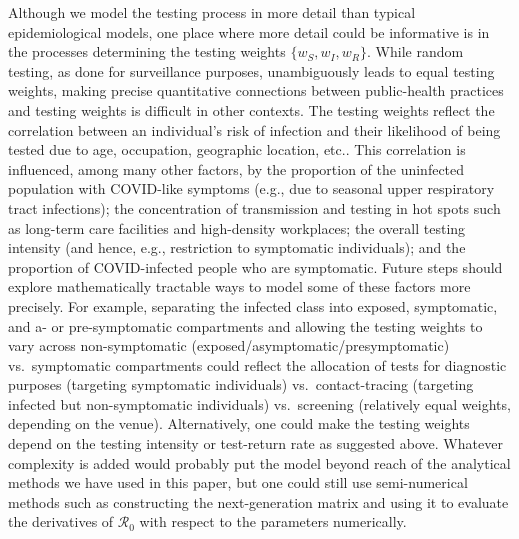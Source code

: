 \documentclass[12pt]{article}
\newcommand{\Rnum}{\ensuremath{\mathcal{R}_0}\xspace}
\DeclareRobustCommand\_{\ifmmode\expandafter\subtxt\else\textunderscore\fi}
\theoremstyle{definition} %
\begin{document}
Although we model the testing process in more detail than typical epidemiological models, one place where more detail could be informative is in the processes determining the testing weights $\{w_S, w_I, w_R\}$. While random testing, as done for surveillance purposes, unambiguously leads to equal testing weights, making precise quantitative connections between public-health practices and testing weights is difficult in other contexts. The testing weights reflect the correlation between an individual's risk of infection and their likelihood of being tested due to age, occupation, geographic location, etc.. This correlation is influenced, among many other factors, by the proportion of the uninfected population with COVID-like symptoms (e.g., due to seasonal upper respiratory tract infections); the concentration of transmission and testing in hot spots such as long-term care facilities and high-density workplaces; the overall testing intensity (and hence, e.g., restriction to symptomatic individuals); and the proportion of COVID-infected people who are symptomatic. Future steps should explore mathematically tractable ways to model some of these factors more precisely. For example, separating the infected class into exposed, symptomatic, and a- or pre-symptomatic compartments and allowing the testing weights to vary across non-symptomatic (exposed/asymptomatic/presymptomatic) vs.\ symptomatic compartments could reflect the allocation of tests for diagnostic purposes (targeting symptomatic individuals) vs.\ contact-tracing (targeting infected but non-symptomatic individuals) vs.\ screening (relatively equal weights, depending on the venue). Alternatively, one could make the testing weights depend on the testing intensity or test-return rate as suggested above. Whatever complexity is added would probably put the model beyond reach of the analytical methods we have used in this paper, but one could still use semi-numerical methods such as constructing the next-generation matrix and using it to evaluate the derivatives of $\Rnum$ with respect to the parameters numerically.
\end{document}
